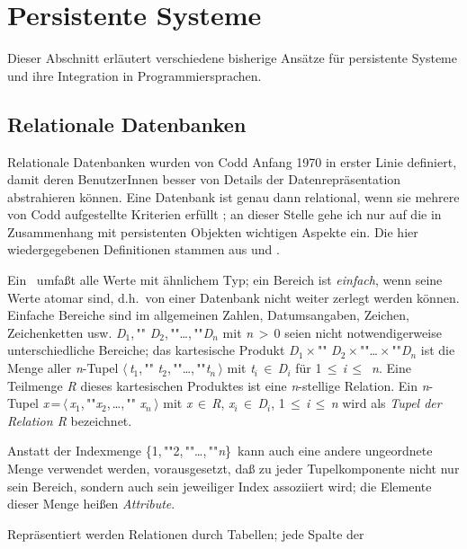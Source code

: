 %
\chapter{Persistente Systeme}%
\label{chap:back}%
%
Dieser Abschnitt erl\"{a}utert verschiedene bisherige Ans\"{a}tze f\"{u}r
persistente Systeme und ihre Integration in Programmiersprachen.
%
\section{Relationale Datenbanken}%
\label{sec:rdb}%
%
Relationale Datenbanken wurden von Codd Anfang 1970 in erster Linie
definiert, damit deren BenutzerInnen besser von Details der
Datenrepr\"{a}sentation abstrahieren k\"{o}nnen. Eine Datenbank ist genau
dann relational, wenn sie mehrere von Codd aufgestellte Kriterien
erf\"{u}llt \cite[]{bib:co79}; an dieser Stelle gehe ich
nur auf die in Zusammenhang mit persistenten Objekten wichtigen
Aspekte ein. Die hier wiedergegebenen Definitionen stammen aus
\cite[]{bib:co79} und \cite[]{bib:schl83}.
%
\par{}Ein \ umfa\ss{}t alle Werte mit
\"{a}hnlichem Typ; ein Bereich ist {\em einfach}, wenn seine Werte atomar
sind, d.h.\ von einer Datenbank nicht weiter zerlegt werden
k\"{o}nnen. Einfache Bereiche sind im allgemeinen Zahlen, Datumsangaben,
Zeichen, Zeichenketten usw.  {\it D}$_1$,\,""{\it
D}$_2$,\,""\ldots,\,""{\it D}$_n$ mit {\it n}\,$>$\,0 seien nicht
notwendigerweise unterschiedliche Bereiche; das kartesische Produkt
{\it D}$_1$\,$\times$\,""{\it
D}$_2$\,$\times$\,""\ldots\,$\times$\,""{\it D}$_n$ ist die Menge
aller {\it n\/}-Tupel $\langle$\,{\it t}$_1$,\,""{\it
t}$_2$,\,""\ldots,\,""{\it t}$_n$\,$\rangle$ mit {\it
t}$_i$\,$\in$\,{\it D}$_i$ f\"{u}r 1\,$\leq$\,{\it i}\,$\leq$\,{\it
n}. Eine Teilmenge {\it R} dieses kartesischen Produktes ist eine {\it
n\/}-stellige Relation. Ein {\it n\/}-Tupel {\it
x}\,=\,$\langle$\,{\it x}$_1$,\,""{\it x}$_2$,\,\ldots,\,""{\it
x}$_n$\,$\rangle$ mit {\it x}\,$\in$\,{\it R}, {\it
x}$_i$\,$\in$\,{\it D}$_i$, 1\,$\leq$\,{\it i}\,$\leq$\,{\it n} wird
als {\em Tupel der Relation R\/} bezeichnet.
%
\par{}Anstatt der Indexmenge
\{1,\,""2,\,""\ldots,\,""{\it n}\}\ kann auch eine andere ungeordnete
Menge verwendet werden, vorausgesetzt, da\ss{} zu jeder Tupelkomponente
nicht nur sein Bereich, sondern auch sein jeweiliger Index assoziiert
wird; die Elemente dieser Menge hei\ss{}en {\em Attribute}.
%
\par{}Repr\"{a}sentiert werden Relationen durch Tabellen; jede Spalte der
